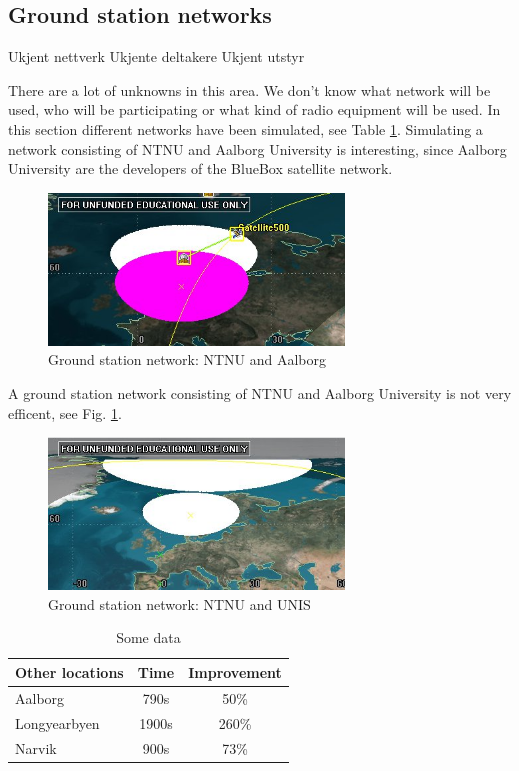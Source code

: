 \subsection{Ground station networks}

Ukjent nettverk
Ukjente deltakere
Ukjent utstyr

There are a lot of unknowns in this area. We don't know what network will be used, who will be participating or what kind of radio equipment will be used. In this section different networks have been simulated, see Table \ref{tab:networks}. 
Simulating a network consisting of NTNU and Aalborg University is interesting, since Aalborg University are the developers of the BlueBox satellite network.
\begin{figure}
  \begin{center}
    \includegraphics[width=0.7\textwidth]{Figures/range_ntnu_aalborg}
  \end{center}
  \caption[NTNU Aalborg]{Ground station network: NTNU and Aalborg}
  \label{fig:range_ntnu_aalborg}
\end{figure}

A ground station network consisting of NTNU and Aalborg University is not very efficent, see Fig. \ref{fig:range_ntnu_aalborg}. 
 
\begin{figure}
  \begin{center}
    \includegraphics[width=0.7\textwidth]{Figures/range_ntnu_svalbard}
  \end{center}
  \caption[NTNU Aalborg]{Ground station network: NTNU and UNIS}
  \label{fig:range_ntnu_unis}
\end{figure}

\begin{table}
\begin{center}
\begin{tabular}{l | c c}
  Other locations & Time & Improvement \\
\hline \hline
  Aalborg & 790s &  50\% \\
\hline
  Longyearbyen & 1900s & 260\% \\
\hline
  Narvik & 900s & 73\%  \\
\end{tabular}
\end{center}
\caption{Some data}
\label{tab:networks}
\end{table}
